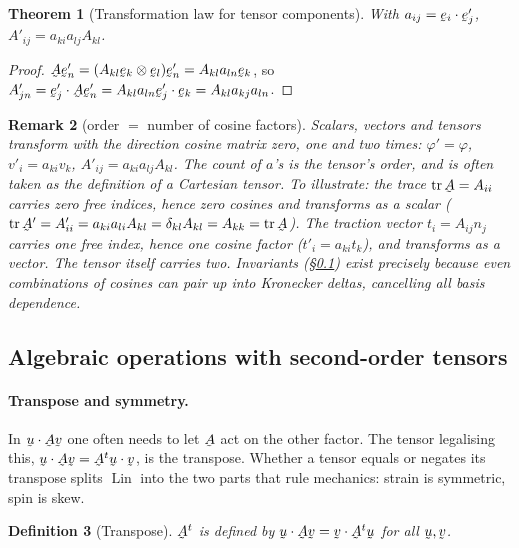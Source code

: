 \documentclass[17pt,a4paper]{extreport}
\DeclareRobustCommand{\vek}[1]{\underaccent{\tilde}{#1}}
\newcommand{\Lin}{\operatorname{Lin}}
\newcommand{\tr}{\operatorname{tr}}
\newcommand{\bu}{\vek{u}}
\newcommand{\bv}{\vek{v}}
\newcommand{\be}{\vek{e}}
\newcommand{\bA}{\vek{A}}
\newcommand{\dd}{\delta}
\newcommand{\ip}[2]{#1\cdot#2}
\theoremstyle{scplain}
\newtheorem{theorem}{Theorem}[chapter]
\theoremstyle{scdefn}
\newtheorem{definition}[theorem]{Definition}
\newtheorem{remark}[theorem]{Remark}
\theoremstyle{scplain}
\begin{document}
\begin{theorem}[Transformation law for tensor components]\label{thm:tenstrans}
With $a_{ij}=\ip{\be_{i}}{\be'_{j}}$, $A'_{ij}=a_{ki}a_{lj}A_{kl}$.
\end{theorem}

\begin{proof}
$\bA\be'_{n}=(A_{kl}\be_{k}\otimes\be_{l})\be'_{n}=A_{kl}a_{ln}\be_{k}$,
so $A'_{jn}=\ip{\be'_{j}}{\bA\be'_{n}}=A_{kl}a_{ln}\ip{\be'_{j}}{\be_{k}}
=A_{kl}a_{kj}a_{ln}$.
\end{proof}

\begin{remark}[order $=$ number of cosine factors]\label{rem:order}
Scalars, vectors and tensors transform with the direction cosine matrix
zero, one and two times: $\varphi'=\varphi$, $v'_{i}=a_{ki}v_{k}$,
$A'_{ij}=a_{ki}a_{lj}A_{kl}$. The count of $a$'s is the tensor's
\emph{order}, and is often taken as the definition of a Cartesian tensor.
To illustrate: the trace $\tr\bA=A_{ii}$ carries zero free indices, hence
zero cosines and transforms as a scalar ($\tr\bA'=A'_{ii}=a_{ki}a_{li}A_{kl}
=\dd_{kl}A_{kl}=A_{kk}=\tr\bA$). The traction vector
$t_i=A_{ij}n_j$ carries one free index, hence one cosine factor ($t'_i
=a_{ki}t_k$), and transforms as a vector. The tensor itself carries two.
Invariants (\S\ref{ss:ops}) exist precisely because even combinations of
cosines can pair up into Kronecker deltas, cancelling all basis dependence.
\end{remark}

\subsection{Algebraic operations with second-order tensors}\label{ss:ops}

\paragraph*{Transpose and symmetry.}
In $\ip\bu{\bA\bv}$ one often needs to let $\bA$ act on the other factor.
The tensor legalising this, $\ip\bu{\bA\bv}=\ip{\bA^{t}\bu}\bv$, is the
transpose. Whether a tensor equals or negates its transpose splits $\Lin$
into the two parts that rule mechanics: strain is symmetric, spin is skew.

\begin{definition}[Transpose]\label{def:transpose}
$\bA^{t}$ is defined by $\ip\bu{\bA\bv}=\ip\bv{\bA^{t}\bu}$ for all
$\bu,\bv$.
\end{definition}
\end{document}
